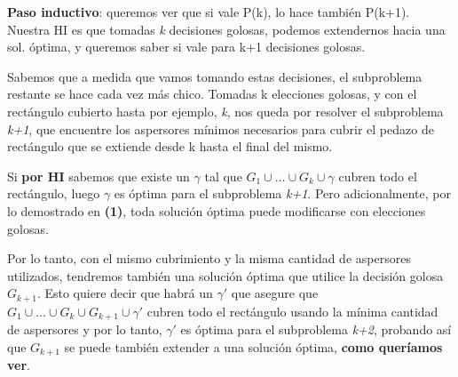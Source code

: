 \documentclass[./main.tex]{subfiles}
\begin{document}
\textbf{Paso inductivo}: queremos ver que si vale P(k), lo hace también P(k+1). 
Nuestra HI es que tomadas \textit{k} decisiones golosas, podemos extendernos hacia una sol. óptima, y queremos saber si vale para k+1 decisiones golosas. \newline

Sabemos que a medida que vamos tomando estas decisiones, el subproblema restante se hace cada vez más chico. Tomadas k elecciones golosas, y con el rectángulo cubierto hasta por ejemplo, \textit{k}, nos queda por resolver el subproblema \textit{k+1}, que encuentre los aspersores mínimos necesarios para cubrir el pedazo de rectángulo que se extiende desde k hasta el final del mismo. \newline

Si \textbf{por HI} sabemos que existe un $\gamma$ tal que \(G_{1} \cup \ldots \cup G_{k} \cup \gamma\) cubren todo el rectángulo, luego $\gamma$ es óptima para el subproblema \textit{k+1}. Pero adicionalmente, por lo demostrado en \textbf{(1)}, toda solución óptima puede modificarse con elecciones golosas. \newline

Por lo tanto, con el mismo cubrimiento y la misma cantidad de aspersores utilizados, tendremos también una solución óptima que utilice la decisión golosa  $G_{k+1}$. Esto quiere decir que habrá un $ \gamma'$ que asegure que \(G_{1} \cup \ldots \cup G_{k} \cup G_{k+1} \cup \gamma'\) cubren todo el rectángulo usando la mínima cantidad de aspersores y por lo tanto, $ \gamma'$ es óptima para el subproblema \textit{k+2}, probando así que $G_{k+1}$ se puede también extender a una solución óptima, \textbf{como queríamos ver}.\done\newline\newline
\end{document}
